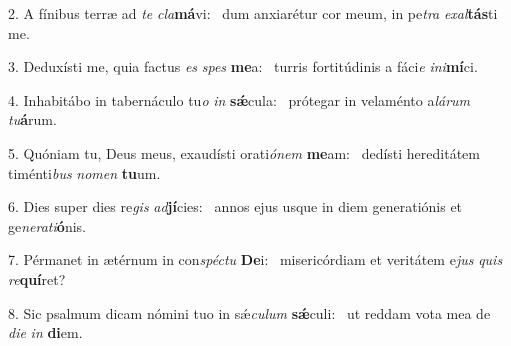 2. A fínibus terræ ad \textit{te} \textit{cla}\textbf{má}vi: \ast\  dum anxiarétur cor meum, in pe\textit{tra} \textit{ex}\textit{al}\textbf{tás}ti me.\

3. Deduxísti me, quia factus \textit{es} \textit{spes} \textbf{me}a: \ast\  turris fortitúdinis a fáci\textit{e} \textit{in}\textit{i}\textbf{mí}ci.\

4. Inhabitábo in tabernáculo tu\textit{o} \textit{in} \textbf{sǽ}cula: \ast\  prótegar in velaménto a\textit{lá}\textit{rum} \textit{tu}\textbf{á}rum.\

5. Quóniam tu, Deus meus, exaudísti orati\textit{ó}\textit{nem} \textbf{me}am: \ast\  dedísti hereditátem timénti\textit{bus} \textit{no}\textit{men} \textbf{tu}um.\

6. Dies super dies re\textit{gis} \textit{ad}\textbf{jí}cies: \ast\  annos ejus usque in diem generatiónis et ge\textit{ne}\textit{ra}\textit{ti}\textbf{ó}nis.\

7. Pérmanet in ætérnum in con\textit{spéc}\textit{tu} \textbf{De}i: \ast\  misericórdiam et veritátem e\textit{jus} \textit{quis} \textit{re}\textbf{quí}ret?\

8. Sic psalmum dicam nómini tuo in sǽ\textit{cu}\textit{lum} \textbf{sǽ}culi: \ast\  ut reddam vota mea de \textit{di}\textit{e} \textit{in} \textbf{di}em.\

